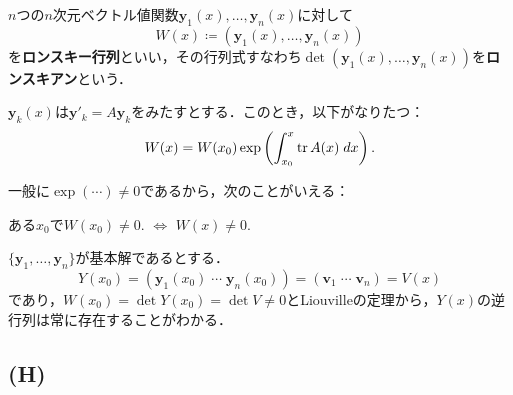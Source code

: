 \begin{definition}
    $n$つの$n$次元ベクトル値関数$\bm{y}_1(x),\ldots,\bm{y}_n(x)$に対して
    \[ W(x) \coloneqq (\bm{y}_1(x),\ldots,\bm{y}_n(x))\]
    を\textbf{ロンスキー行列}といい，その行列式すなわち$\det (\bm{y}_1(x),\ldots,\bm{y}_n(x))$を\textbf{ロンスキアン}という．
\end{definition}

\begin{theorem}[Liouvilleの定理]
    $\bm{y}_k(x)$は$\bm{y}'_k = A\bm{y}_k$をみたすとする．このとき，以下がなりたつ：
    \[ W(x) = W(x_0) \exp \left(\int_{x_0}^x \operatorname{\mathrm{tr}} A(x) \; dx\right).\]
\end{theorem}
一般に$\exp(\cdots) \neq 0$であるから，次のことがいえる：
\begin{note*}
    ある$x_0$で$W(x_0) \neq 0.$ $\iff$ $W(x) \neq 0.$
\end{note*}

$\{\bm{y}_1,\ldots,\bm{y}_n\}$が基本解であるとする．
\[ Y(x_0) = (\bm{y}_1(x_0) \; \cdots \; \bm{y}_n(x_0)) = (\bm{v}_1 \; \cdots \; \bm{v}_n) = V(x)\]
であり，$W(x_0) = \det Y(x_0) = \det V \neq 0$とLiouvilleの定理から，$Y(x)$の逆行列は常に存在することがわかる．

\subsection{(H)}
